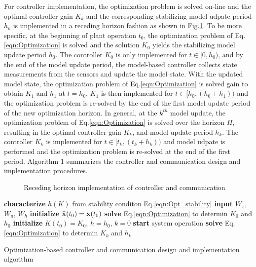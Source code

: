 \documentclass[letterpaper, 10 pt, conference]{ieeeconf}\IEEEoverridecommandlockouts%
\begin{document}
For controller implementation, the optimization problem is solved on-line and the optimal controller gain $K_k$ and the corresponding stabilizing model udpate period $h_k$ is implemented in a receding horizon fashion as shown in Fig.\ref{fig:RecedingHorizon}. To be more specific, at the beginning of plant operation $t_0$, the optimization problem of Eq.\ref{eqn:Optimization} is solved and the solution $K_0$ yields the stabilizing model update period $h_0$. The controller $K_0$ is only implemented for $t \in [0,h_0)$, and by the end of the model update period, the model-based controller collects state measurements from the sensors and update the model state. With the updated model state, the optimization problem of Eq.\ref{eqn:Optimization} is solved gain to obtain $K_1$ and $h_1$ at $t = h_0$. $K_1$ is then implemented for $t \in [h_0,(h_0+h_1))$ and the optimization problem is re-solved by the end of the first model update period of the new optimization horizon. In general, at the $k^{th}$ model update, the optimization problem of Eq.\ref{eqn:Optimization} is solved over the horizon $H$, resulting in the optimal controller gain $K_k$, and model update period $h_k$. The controller $K_k$ is implemented for $t \in [t_k, (t_k+h_k))$ and model udpate is performed and the optimization problem is re-solved at the end of the first period. Algorithm 1 summarizes the controller and communication design and implementation procedures.

\begin{figure}[hptb]
  \centerline{\hspace{2mm}\hspace{-4mm}{\footnotesize}}
  \caption{Receding horizon implementation of controller and communication}\label{fig:RecedingHorizon}
\end{figure}

\LinesNumbered\IncMargin{1em}
\begin{algorithm}\label{algorithm}
  \textbf{characterize} $h(K)$ from stability conditon Eq.\ref{eqn:Opt_stability}\; \label{alg:CharH}
  \textbf{input} $W_x$, $W_u$, $W_h$\;
  \textbf{initialize} $\widehat{\mathbf{x}}(t_0) = \mathbf{x}(t_0)$\;\label{alg:init}
  \textbf{solve} Eq.\ref{eqn:Optimization} to determin $K_0$ and $h_0$\;
  \textbf{initialize} $K(t_0) = K_0$, $h = h_0$, $k = 0$\;
  \textbf{start} system operation\;
  \textbf{solve} Eq.\ref{eqn:Optimization} to determin $K_{k}$ and $h_{k}$\;\label{alg:return}
\caption{Optimization-based controller and communication design and implementation algorithm}
\end{algorithm}
\end{document}
